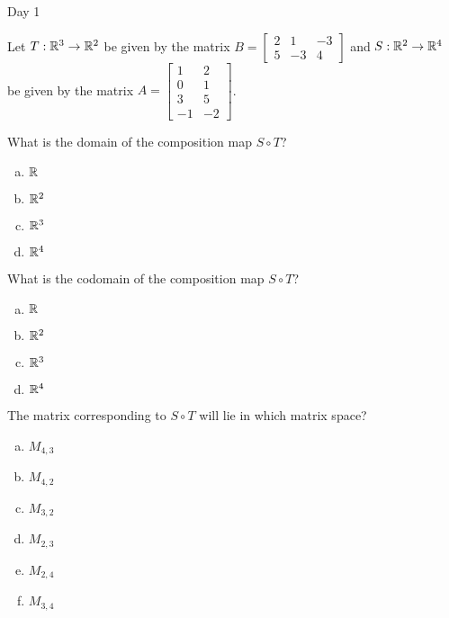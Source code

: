 
\begin{applicationActivities}{Day 1}

\begin{activity}
Let $T: \mathbb{R}^3 \rightarrow \mathbb{R}^2$ be given by the matrix $B=\begin{bmatrix} 2 & 1 & -3 \\ 5 & -3 & 4 \end{bmatrix}$ and $S: \mathbb{R}^2 \rightarrow \mathbb{R}^4$ be given by the matrix $A=\begin{bmatrix} 1 & 2 \\ 0 & 1 \\ 3 & 5 \\ -1 & -2 \end{bmatrix}$.

What is the domain of the composition map $S \circ T$?
\begin{enumerate}[(a)]
\item $\mathbb{R}$
\item $\mathbb{R}^2$
\item $\mathbb{R}^3$
\item $\mathbb{R}^4$
\end{enumerate}
\end{activity}

\begin{activity}
What is the codomain of the composition map $S \circ T$?
\begin{enumerate}[(a)]
\item $\mathbb{R}$
\item $\mathbb{R}^2$
\item $\mathbb{R}^3$
\item $\mathbb{R}^4$
\end{enumerate}
\end{activity}

\begin{activity}
The matrix corresponding to $S \circ T$ will lie in which matrix space?
\begin{enumerate}[(a)]
\item $M_{4,3}$
\item $M_{4,2}$
\item $M_{3,2}$
\item $M_{2,3}$
\item $M_{2,4}$
\item $M_{3,4}$
\end{enumerate}
\end{activity}


\end{applicationActivities}
